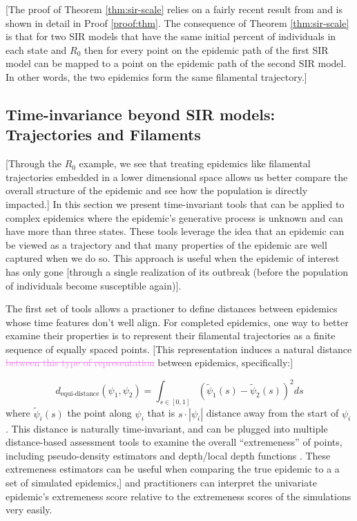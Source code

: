 \documentclass[
  shortnames]{jss}
\begin{document}
{[}The proof of Theorem \ref{thm:sir-scale} relies on a fairly recent
result from \cite{Harko2014} and is shown in detail in Proof
\ref{proof:thm}. The consequence of Theorem \ref{thm:sir-scale} is that
for two SIR models that have the same initial percent of individuals in
each state and \(R_0\) then for every point on the epidemic path of the
first SIR model can be mapped to a point on the epidemic path of the
second SIR model. In other words, the two epidemics form the same
filamental trajectory.{]}

\hypertarget{time-invariance-beyond-sir-models-trajectories-and-filaments}{%
\subsection{Time-invariance beyond SIR models: Trajectories and
Filaments}\label{time-invariance-beyond-sir-models-trajectories-and-filaments}}

{[}Through the \(R_0\) example, we see that treating epidemics like
filamental trajectories embedded in a lower dimensional space allows us
better compare the overall structure of the epidemic and see how the
population is directly impacted.{]} In this section we present
time-invariant tools that can be applied to complex epidemics where the
epidemic's generative process is unknown and can have more than three
states. These tools leverage the idea that an epidemic can be viewed as
a trajectory and that many properties of the epidemic are well captured
when we do so. This approach is useful when the epidemic of interest has
only gone {[}through a single realization of its outbreak (before the
population of individuals become susceptible again){]}.

The first set of tools allows a practioner to define distances between
epidemics whose time features don't well align. For completed epidemics,
one way to better examine their properties is to represent their
filamental trajectories as a finite sequence of equally spaced points.
{[}This representation induces a natural distance
\textcolor{violet}{\sout{between this type of representation}} between
epidemics, specifically:{]}

\[
d_\text{equi-distance}(\psi_1, \psi_2)  = \int_{s \in [0,1]} (\tilde{\psi}_1(s) - \tilde{\psi}_2(s))^2 ds
\] where \(\tilde{\psi}_i(s)\) the point along \(\psi_i\) that is
\(s\cdot|\psi_i|\) distance away from the start of \(\psi_i\). This
distance is naturally time-invariant, and can be plugged into multiple
distance-based assessment tools to examine the overall ``extremeness''
of points, including pseudo-density estimators and depth/local depth
functions \citep[for examples see][]{Ciollaro2016, Geenens2017}. These
extremeness estimators can be useful when comparing the true epidemic to
a a set of simulated epidemics,{]} and practitioners can interpret the
univariate epidemic's extremeness score relative to the extremeness
scores of the simulations very easily.
\end{document}

